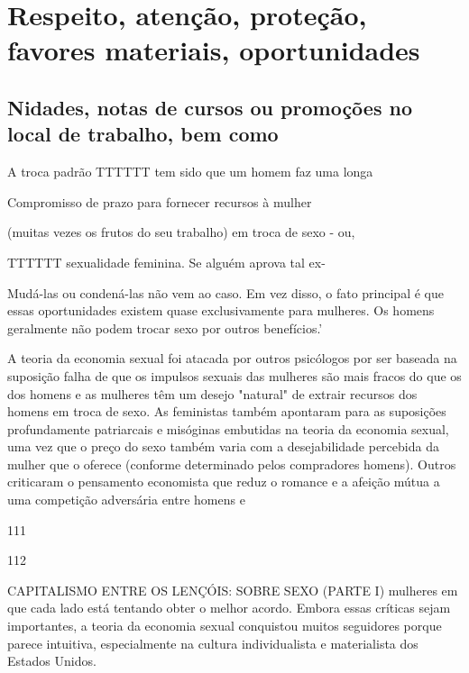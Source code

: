 \chapter{Respeito, atenção, proteção, favores materiais, oportunidades}\label{Respeito, atenção, proteção, favores materiais, oportunidades}
 \par 
\section{Nidades, notas de cursos ou promoções no local de trabalho, bem como}
 \par 
A troca padrão TTTTTT tem sido que um homem faz uma longa
 \par 
Compromisso de prazo para fornecer recursos à mulher
 \par 
(muitas vezes os frutos do seu trabalho) em troca de sexo - ou,
 \par 
TTTTTT sexualidade feminina. Se alguém aprova tal ex-
 \par 
Mudá-las ou condená-las não vem ao caso. Em vez disso, o fato principal é que essas oportunidades existem quase exclusivamente para mulheres. Os homens geralmente não podem trocar sexo por outros benefícios.’
 \par 
A teoria da economia sexual foi atacada por outros psicólogos por ser baseada na suposição falha de que os impulsos sexuais das mulheres são mais fracos do que os dos homens e as mulheres têm um desejo "natural" de extrair recursos dos homens em troca de sexo. As feministas também apontaram para as suposições profundamente patriarcais e misóginas embutidas na teoria da economia sexual, uma vez que o preço do sexo também varia com a desejabilidade percebida da mulher que o oferece (conforme determinado pelos compradores homens). Outros criticaram o pensamento economista que reduz o romance e a afeição mútua a uma competição adversária entre homens e
 \par 
111
 \par 
112
 \par 
CAPITALISMO ENTRE OS LENÇÓIS: SOBRE SEXO (PARTE I) mulheres em que cada lado está tentando obter o melhor acordo. Embora essas críticas sejam importantes, a teoria da economia sexual conquistou muitos seguidores porque parece intuitiva, especialmente na cultura individualista e materialista dos Estados Unidos.
 \par 
